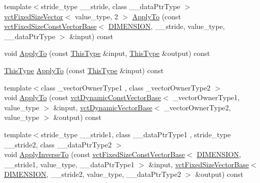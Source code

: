 \begin{DoxyCompactItemize}
\item 
{\footnotesize template$<$stride\+\_\+type \+\_\+\+\_\+stride, class \+\_\+\+\_\+data\+Ptr\+Type $>$ }\\\hyperlink{classvct_fixed_size_vector}{vct\+Fixed\+Size\+Vector}$<$ value\+\_\+type, 2 $>$ \hyperlink{classvct_matrix_rotation2_base_a2bc7baf6dc98626913c07c3f04cadb54}{Apply\+To} (const \hyperlink{classvct_fixed_size_const_vector_base}{vct\+Fixed\+Size\+Const\+Vector\+Base}$<$ \hyperlink{classvct_matrix_rotation2_base_ac10279ed12ec787b1a4833ea02771348acefb9855f54f0cfd782e785c9083e592}{D\+I\+M\+E\+N\+S\+I\+O\+N}, \+\_\+\+\_\+stride, value\+\_\+type, \+\_\+\+\_\+data\+Ptr\+Type $>$ \&input) const 
\item 
void \hyperlink{classvct_matrix_rotation2_base_a469ac3c9d4096e008972938dbf8e00bf}{Apply\+To} (const \hyperlink{classvct_matrix_rotation2_base_a47ffeef2ddecede4b16bcc88fb432ff5}{This\+Type} \&input, \hyperlink{classvct_matrix_rotation2_base_a47ffeef2ddecede4b16bcc88fb432ff5}{This\+Type} \&output) const 
\item 
\hyperlink{classvct_matrix_rotation2_base_a47ffeef2ddecede4b16bcc88fb432ff5}{This\+Type} \hyperlink{classvct_matrix_rotation2_base_abd982d8904da149f4fb22ad8e8f8f79e}{Apply\+To} (const \hyperlink{classvct_matrix_rotation2_base_a47ffeef2ddecede4b16bcc88fb432ff5}{This\+Type} \&input) const 
\item 
{\footnotesize template$<$class \+\_\+vector\+Owner\+Type1 , class \+\_\+vector\+Owner\+Type2 $>$ }\\void \hyperlink{classvct_matrix_rotation2_base_aff4459bd033c0f20c63712369b79fa82}{Apply\+To} (const \hyperlink{classvct_dynamic_const_vector_base}{vct\+Dynamic\+Const\+Vector\+Base}$<$ \+\_\+vector\+Owner\+Type1, value\+\_\+type $>$ \&input, \hyperlink{classvct_dynamic_vector_base}{vct\+Dynamic\+Vector\+Base}$<$ \+\_\+vector\+Owner\+Type2, value\+\_\+type $>$ \&output) const 
\item 
{\footnotesize template$<$stride\+\_\+type \+\_\+\+\_\+stride1, class \+\_\+\+\_\+data\+Ptr\+Type1 , stride\+\_\+type \+\_\+\+\_\+stride2, class \+\_\+\+\_\+data\+Ptr\+Type2 $>$ }\\void \hyperlink{classvct_matrix_rotation2_base_a1afd4d3ae2b8d01092ec5585ce489ddb}{Apply\+Inverse\+To} (const \hyperlink{classvct_fixed_size_const_vector_base}{vct\+Fixed\+Size\+Const\+Vector\+Base}$<$ \hyperlink{classvct_matrix_rotation2_base_ac10279ed12ec787b1a4833ea02771348acefb9855f54f0cfd782e785c9083e592}{D\+I\+M\+E\+N\+S\+I\+O\+N}, \+\_\+\+\_\+stride1, value\+\_\+type, \+\_\+\+\_\+data\+Ptr\+Type1 $>$ \&input, \hyperlink{classvct_fixed_size_vector_base}{vct\+Fixed\+Size\+Vector\+Base}$<$ \hyperlink{classvct_matrix_rotation2_base_ac10279ed12ec787b1a4833ea02771348acefb9855f54f0cfd782e785c9083e592}{D\+I\+M\+E\+N\+S\+I\+O\+N}, \+\_\+\+\_\+stride2, value\+\_\+type, \+\_\+\+\_\+data\+Ptr\+Type2 $>$ \&output) const 

\end{DoxyCompactItemize}
